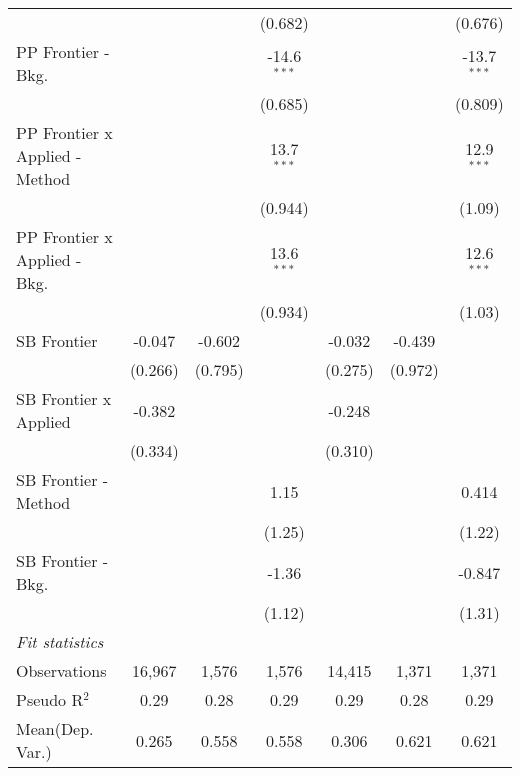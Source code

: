 \begin{tabular}{lcccccc}
                                  &               &               & (0.682)        &                &                & (0.676)\\   
   PP Frontier - Bkg.             &               &               & -14.6$^{***}$  &                &                & -13.7$^{***}$\\   
                                  &               &               & (0.685)        &                &                & (0.809)\\   
   PP Frontier x Applied - Method &               &               & 13.7$^{***}$   &                &                & 12.9$^{***}$\\   
                                  &               &               & (0.944)        &                &                & (1.09)\\   
   PP Frontier x Applied - Bkg.   &               &               & 13.6$^{***}$   &                &                & 12.6$^{***}$\\   
                                  &               &               & (0.934)        &                &                & (1.03)\\   
   SB Frontier                    & -0.047        & -0.602        &                & -0.032         & -0.439         &   \\   
                                  & (0.266)       & (0.795)       &                & (0.275)        & (0.972)        &   \\   
   SB Frontier x Applied          & -0.382        &               &                & -0.248         &                &   \\   
                                  & (0.334)       &               &                & (0.310)        &                &   \\   
   SB Frontier - Method           &               &               & 1.15           &                &                & 0.414\\   
                                  &               &               & (1.25)         &                &                & (1.22)\\   
   SB Frontier - Bkg.             &               &               & -1.36          &                &                & -0.847\\   
                                  &               &               & (1.12)         &                &                & (1.31)\\   
   \midrule
   \emph{Fit statistics}\\
   Observations                   & 16,967        & 1,576         & 1,576          & 14,415         & 1,371          & 1,371\\  
   Pseudo R$^2$                   & 0.29          & 0.28          & 0.29           & 0.29           & 0.28           & 0.29\\  
Mean(Dep. Var.) & 0.265 & 0.558 & 0.558 & 0.306 & 0.621 & 0.621 \\
   

\end{tabular}

